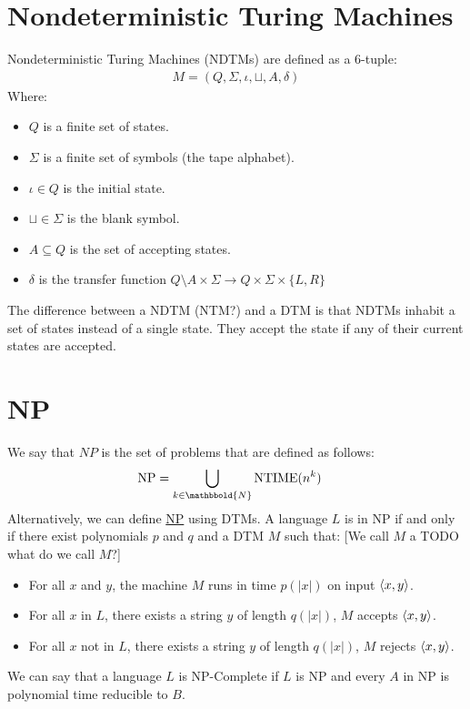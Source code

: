     \section{Nondeterministic Turing Machines}
        Nondeterministic Turing Machines (NDTMs) are defined as a 6-tuple:
        \begin{align*}
            M = (Q, \Sigma, \iota, \sqcup, A, \delta)
        \end{align*}
        Where:
        \begin{itemize}
            \item $Q$ is a finite set of states.
            \item $\Sigma$ is a finite set of symbols (the tape alphabet).
            \item $\iota \in Q$ is the initial state.
            \item $\sqcup \in \Sigma$ is the blank symbol.
            \item $A \subseteq Q$ is the set of accepting states.
            \item $\delta$ is the transfer function
            $Q \setminus A \times \Sigma \to Q \times \Sigma \times \{ L, R \}$
        \end{itemize}
        The difference between a NDTM (NTM?) and a DTM is that NDTMs inhabit a
        set of states instead of a single state. They accept the state if any of
        their current states are accepted.

    \section{NP}
        We say that $NP$ is the set of problems that are defined as follows:
        \begin{align*}
            \mbox{NP} &= \bigcup_{k \in \mathbbold{N}} \mbox{NTIME}(n^k)
        \end{align*}
        Alternatively, we can define \uline{NP} using DTMs. A language $L$ is in
        NP if and only if there exist polynomials $p$ and $q$ and a DTM $M$ such
        that:
        [We call $M$ a TODO what do we call $M$?]
        \begin{itemize}
            \item For all $x$ and $y$, the machine $M$ runs in time $p(|x|)$ on
            input $\left \langle x, y \right \rangle $.
            \item For all $x$ in $L$, there exists a string $y$ of length
            $q(|x|)$, $M$ accepts $\left \langle x, y \right \rangle $.
            \item For all $x$ not in $L$, there exists a string $y$ of length
            $q(|x|)$, $M$ rejects $\left \langle x, y \right \rangle $.
        \end{itemize}
        We can say that a language $L$ is NP-Complete if $L$ is NP and every $A$
        in NP is polynomial time reducible to $B$.

